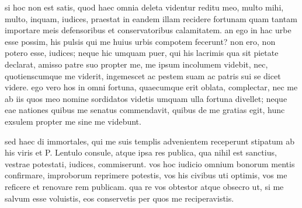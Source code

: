  si hoc non est satis, quod haec omnia deleta videntur reditu meo, multo mihi, multo, inquam, iudices, praestat in eandem illam recidere fortunam quam tantam importare meis defensoribus et conservatoribus calamitatem. an ego in hac urbe esse possim, his pulsis qui me huius urbis compotem fecerunt? non ero, non potero esse, iudices; neque hic umquam puer, qui his lacrimis qua sit pietate declarat, amisso patre suo propter me, me ipsum incolumem videbit, nec, quotienscumque me viderit, ingemescet ac pestem suam ac patris sui se dicet videre. ego vero hos in omni fortuna, quaecumque erit oblata, complectar, nec me ab iis quos meo nomine sordidatos videtis umquam ulla fortuna divellet; neque eae nationes quibus me senatus commendavit, quibus de me gratias egit, hunc exsulem propter me sine me videbunt.

 sed haec di immortales, qui me suis templis advenientem receperunt stipatum ab his viris et P. Lentulo consule, atque ipsa res publica, qua nihil est sanctius, vestrae potestati, iudices, commiserunt. vos hoc iudicio omnium bonorum mentis confirmare, improborum reprimere potestis, vos his civibus uti optimis, vos me reficere et renovare rem publicam. qua re vos obtestor atque obsecro ut, si me salvum esse voluistis, eos conservetis per quos me reciperavistis.
